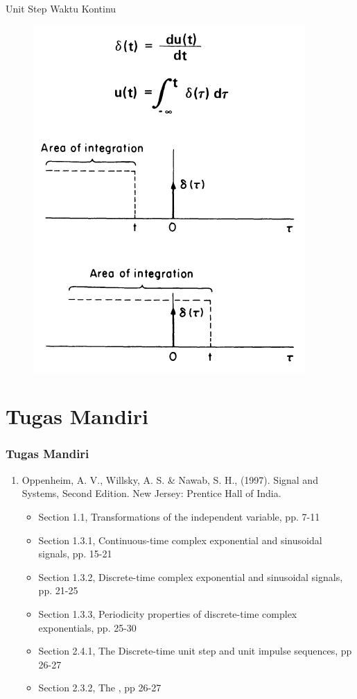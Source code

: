 \documentclass[pdflatex,compress,mathserif]{beamer}
\begin{document}
\begin{frame}{Unit Step Waktu Kontinu}
	\begin{figure}
		\centering
		\includegraphics[height=0.8\textheight]{img/02.slide_08}
	\end{figure}
\end{frame}

\section{Tugas Mandiri}

\begin{frame}
	\frametitle{Tugas Mandiri}
	\begin{enumerate}
		\item Oppenheim, A. V., Willsky, A. S. \& Nawab, S. H., (1997). Signal and Systems, Second Edition. New Jersey: Prentice Hall of India.
		\begin{itemize}
			\item Section 1.1, Transformations of the independent variable, pp. 7-11
			\item Section 1.3.1, Continuous-time complex exponential and sinusoidal signals, pp. 15-21
			\item Section 1.3.2, Discrete-time complex exponential and sinusoidal signals, pp. 21-25
			\item Section 1.3.3, Periodicity properties of discrete-time complex exponentials, pp. 25-30
			\item Section 2.4.1, The Discrete-time unit step and unit impulse sequences, pp 26-27
			\item Section 2.3.2, The , pp 26-27
		\end{itemize}
	\end{enumerate}
\end{frame}
\end{document}
